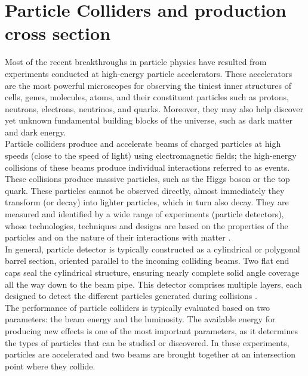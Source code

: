 \section{Particle Colliders and production cross section}

Most of the recent breakthroughs in particle physics have resulted from experiments conducted at high-energy particle accelerators. These accelerators are the most powerful microscopes for observing the tiniest inner structures of cells, genes, molecules, atoms, and their constituent particles such as protons, neutrons, electrons, neutrinos, and quarks. Moreover, they may also help discover yet unknown fundamental building blocks of the universe, such as dark matter and dark energy.\\

Particle colliders produce and accelerate beams of charged particles at high speeds (close to the speed of light) using electromagnetic fields; the high-energy collisions of these beams produce individual interactions referred to as events. These collisions produce massive particles, such as the Higgs boson or the top quark. These particles  cannot be observed directly, almost immediately they transform (or decay) into lighter particles, which in turn also decay. They are measured and identified by a wide range of experiments (particle detectors), whose technologies, techniques and designs are based on the properties of the particles and on the nature of their interactions with matter \cite{thomson_2013}.\\

In general, particle detector is typically constructed as a cylindrical or polygonal barrel section, oriented parallel to the incoming colliding beams. Two flat end caps seal the cylindrical structure, ensuring nearly complete solid angle coverage all the way down to the beam pipe. This detector comprises multiple layers, each designed to detect the different particles generated during collisions \cite{thomson_2013}.\\

The performance of particle colliders is typically evaluated based on two parameters: the beam energy and the luminosity. The available energy for producing new effects is one of the most important parameters, as it determines the types of particles that can be studied or discovered. In these experiments, particles are accelerated and two beams are brought together at an intersection point where they collide.\\

